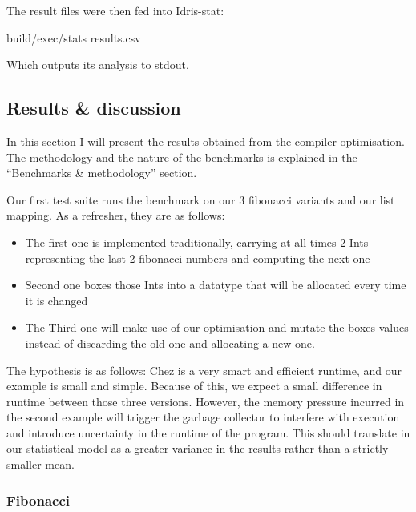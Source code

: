 \documentclass[
]{article}
\newenvironment{Shaded}{}{}
\newcommand{\NormalTok}[1]{#1}
\newcommand{\OperatorTok}[1]{\textcolor[rgb]{0.40,0.40,0.40}{#1}}
\providecommand{\tightlist}{%
  \setlength{\itemsep}{0pt}\setlength{\parskip}{0pt}}
\begin{document}
The result files were then fed into Idris-stat:

\begin{Shaded}
\begin{Highlighting}[]
\NormalTok{build}\OperatorTok{/}\NormalTok{exec}\OperatorTok{/}\NormalTok{stats results}\OperatorTok{.}\NormalTok{csv}
\end{Highlighting}
\end{Shaded}

Which outputs its analysis to stdout.

\hypertarget{results-discussion}{%
\subsection{Results \& discussion}\label{results-discussion}}

In this section I will present the results obtained from the compiler
optimisation. The methodology and the nature of the benchmarks is
explained in the ``Benchmarks \& methodology'' section.

Our first test suite runs the benchmark on our 3 fibonacci variants and
our list mapping. As a refresher, they are as follows:

\begin{itemize}
\tightlist
\item
  The first one is implemented traditionally, carrying at all times 2
  Ints representing the last 2 fibonacci numbers and computing the next
  one
\item
  Second one boxes those Ints into a datatype that will be allocated
  every time it is changed
\item
  The Third one will make use of our optimisation and mutate the boxes
  values instead of discarding the old one and allocating a new one.
\end{itemize}

The hypothesis is as follows: Chez is a very smart and efficient
runtime, and our example is small and simple. Because of this, we expect
a small difference in runtime between those three versions. However, the
memory pressure incurred in the second example will trigger the garbage
collector to interfere with execution and introduce uncertainty in the
runtime of the program. This should translate in our statistical model
as a greater variance in the results rather than a strictly smaller
mean.

\hypertarget{fibonacci-1}{%
\subsubsection{Fibonacci}\label{fibonacci-1}}
\end{document}

